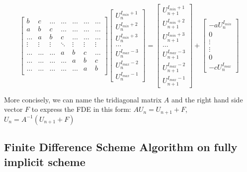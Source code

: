 \[
\begin{bmatrix}
    b & c & \dots & \dots  & \dots & \dots & \dots\\
    a & b & c & \dots  & \dots & \dots & \dots\\
    \dots & a & b & c & \dots & \dots & \dots\\
    \vdots & \vdots & \vdots & \ddots & \vdots & \vdots & \vdots \\
    \dots & \dots & \dots & a & b & c & \dots\\
    \dots & \dots & \dots & \dots & a & b & c\\
    \dots & \dots & \dots & \dots & \dots & a & b\\
\end{bmatrix}
\begin{bmatrix}
    U_{n}^{I_{min}+1}\\
    U_{n}^{I_{min}+2}\\
    U_{n}^{I_{min}+3}\\
    \dots \\
    U_{n}^{I_{max}-3}\\
    U_{n}^{I_{max}-2}\\
    U_{n}^{I_{max}-1}
\end{bmatrix}
=
\begin{bmatrix}
    U_{n+1}^{I_{min}+1}\\
    U_{n+1}^{I_{min}+2}\\
    U_{n+1}^{I_{min}+3}\\
    \dots \\
    U_{n+1}^{I_{max}-3}\\
    U_{n+1}^{I_{max}-2}\\
    U_{n+1}^{I_{max}-1}
\end{bmatrix}
+
\begin{bmatrix}
    -aU_{n}^{I_{min}}\\
    0\\
    \vdots \\
    \vdots \\
    0\\
    -cU_{n}^{I_{max}}
\end{bmatrix}
\]

More concisely, we can name the tridiagonal matrix $A$ and the right hand side vector $F$ to express the FDE in this form: $AU_{n} = U_{n+1} + F$, $U_{n} = A^{-1}(U_{n+1} + F)$

\subsection{Finite Difference Scheme Algorithm on fully implicit scheme}


